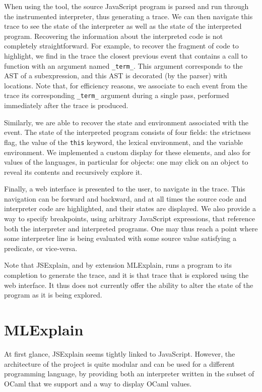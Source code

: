 \documentclass[twocolumn,a4paper]{article}
\begin{document}
When using the tool, the source JavaScript program is parsed and run through the
instrumented interpreter, thus generating a trace. We can then navigate this
trace to see the state of the interpreter as well as the state of the
interpreted program. Recovering the information about the interpreted code is
not completely straightforward. For example, to recover the fragment of code to
highlight, we find in the trace the closest previous event that contains a call
to function with an argument named \texttt{\_term\_}. This argument corresponds
to the AST of a subexpression, and this AST is decorated (by the parser) with
locations. Note that, for efficiency reasons, we associate to each event from
the trace its corresponding \texttt{\_term\_} argument during a single pass,
performed immediately after the trace is produced.

Similarly, we are able to recover the state and environment associated with the
event. The state of the interpreted program consists of four fields: the
strictness flag, the value of the \texttt{this} keyword, the lexical
environment, and the variable environment. We implemented a custom display for
these elements, and also for values of the languages, in particular for objects:
one may click on an object to reveal its contents and recursively explore it.

Finally, a web interface is presented to the user, to navigate in the trace.
This navigation can be forward and backward, and at all times the source code
and interpreter code are highlighted, and their states are displayed. We also
provide a way to specify breakpoints, using arbitrary JavaScript expressions,
that reference both the interpreter and interpreted programs. One may thus reach
a point where some interpreter line is being evaluated with some source value
satisfying a predicate, or vice-versa.

Note that JSExplain, and by extension MLExplain, runs a program to its
completion to generate the trace, and it is that trace that is explored using
the web interface. It thus does not currently offer the ability to alter the
state of the program as it is being explored.

\section{MLExplain}

At first glance, JSExplain seems tightly linked to JavaScript. However, the
architecture of the project is quite modular and can be used for a different
programming language, by providing both an interpreter written in the subset of
OCaml that we support and a way to display OCaml values.
\end{document}
